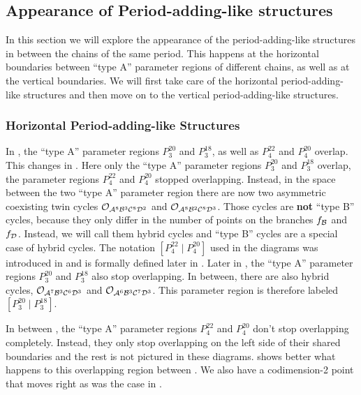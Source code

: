 \subsection{Appearance of Period-adding-like structures}
\label{sec:add.change.appa}

In this section we will explore the appearance of the period-adding-like structures in between the chains of the same period.
This happens at the horizontal boundaries between ``type A'' parameter regions of different chains, as well as at the vertical boundaries.
We will first take care of the horizontal period-adding-like structures and then move on to the vertical period-adding-like structures.

\subsubsection{Horizontal Period-adding-like Structures}
\label{sec:add.change.appa.hor}

In , the ``type A'' parameter regions $P^{20}_3$ and $P^{18}_3$, as well as $P^{22}_4$ and $P^{20}_4$ overlap.
This changes in .
Here only the ``type A'' parameter regions $P^{20}_3$ and $P^{18}_3$ overlap, the parameter regions $P^{22}_4$ and $P^{20}_4$ stopped overlapping.
Instead, in the space between the two ``type A'' parameter region there are now two asymmetric coexisting twin cycles $\mathcal{O}_{\mathcal{A}^8\mathcal{B}^3\mathcal{C}^8\mathcal{D}^2}$ and $\mathcal{O}_{\mathcal{A}^8\mathcal{B}^2\mathcal{C}^8\mathcal{D}^3}$.
Those cycles are \textbf{not} ``type B'' cycles, because they only differ in the number of points on the branches $f_{\mathcal{B}}$ and $f_{\mathcal{D}}$.
Instead, we will call them hybrid cycles and ``type B'' cycles are a special case of hybrid cycles.
The notation $\left[P^{22}_4 \mid P^{20}_4\right]$ used in the diagrams was introduced in  and is formally defined later in .
Later in , the ``type A'' parameter regions $P^{20}_3$ and $P^{18}_3$ also stop overlapping.
In between, there are also hybrid cycles, $\mathcal{O}_{\mathcal{A}^7\mathcal{B}^3\mathcal{C}^6\mathcal{D}^3}$ and $\mathcal{O}_{\mathcal{A}^6\mathcal{B}^3\mathcal{C}^7\mathcal{D}^3}$.
This parameter region is therefore labeled $\left[P^{20}_3 \mid P^{18}_3\right]$.

In between , the ``type A'' parameter regions $P^{22}_4$ and $P^{20}_4$ don't stop overlapping completely.
Instead, they only stop overlapping on the left side of their shared boundaries and the rest is not pictured in these diagrams.
 shows better what happens to this overlapping region between .
We also have a codimension-2 point that moves right as was the case in .

